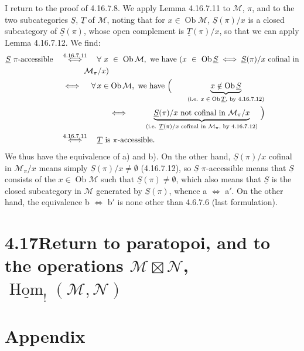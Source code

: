 \documentclass[11pt]{article}
\newcommand{\printedpage}[1]{\marginpar{\footnotesize p.~#1}}
\newcommand{\msp}[1]{\marginpar{\footnotesize [#1]}}
\newcommand{\cM}{\mathcal{M}}
\newcommand{\cN}{\mathcal{N}}
\newcommand{\Ob}{\operatorname{Ob}}
\begin{document}
\noindent I return to the proof of 4.16.7.8. We apply Lemma 4.16.7.11 to $\cM$, $\pi$, and to the two
\msp{page 491}
subcategories $\underline{S}$, $\underline{T}$ of $\cM$, noting that for $x\in\Ob\cM$, $\underline{S}(\pi)/x$ is a closed subcategory of $\underline{S}(\pi)$, whose open complement is $\underline{T}(\pi)/x$, so that we can apply Lemma 4.16.7.12. We find:
\[
\begin{aligned}
\underline{S}\ \pi\text{-accessible} \quad &\overset{4.16.7.11}{\iff} \quad \forall\ x\ \in\ \Ob\cM,\ \text{we have } (x\ \in\ \Ob\underline{S}\iff\underline{S}(\pi)/x \text{ cofinal in}\\
&\qquad\quad \cM_\pi/x)\\
&\iff \quad \forall\, x\in\Ob\cM,\ \text{we have } \Bigl( \qquad \underbrace{x\notin\Ob\underline{S}}_{\text{(i.e. $x\in\Ob\underline{T}$, by 4.16.7.12)}}\\
&\qquad\qquad\qquad \iff \qquad \underbrace{\underline{S}(\pi)/x \text{ not cofinal in } \cM_\pi/x}_{\text{(i.e. $\underline{T}(\pi)/x$ cofinal in $\cM_\pi$, by 4.16.7.12)}} \ \Bigr)\\
&\overset{4.16.7.11}{\iff} \quad \underline{T} \text{ is } \pi\text{-accessible.}
\end{aligned}
\]
We thus have the equivalence of a) and b). On the other hand, $\underline{S}(\pi)/x$ cofinal in $\cM_\pi/x$ means simply $\underline{S}(\pi)/x\neq\emptyset$ (4.16.7.12), so $\underline{S}$ $\pi$-accessible means that $\underline{S}$ consists of the $x\in\Ob\cM$ such that $\underline{S}(\pi)\neq\emptyset$, which also means that $\underline{S}$ is the closed subcategory in $\cM$ generated by $\underline{S}(\pi)$, whence a $\iff$ a$'$. On the other hand, the equivalence b $\iff$ b$'$ is none other than 4.6.7.6 (last formulation). %

\msp{page 492}

\section*{4.17\quad Return to paratopoi, and to the operations $\cM\boxtimes\cN$, $\underline{\operatorname{Hom}}_{!}(\cM,\cN)$}

\noindent

\printedpage{191}

\msp{page 1}

\section*{Appendix}
\end{document}
